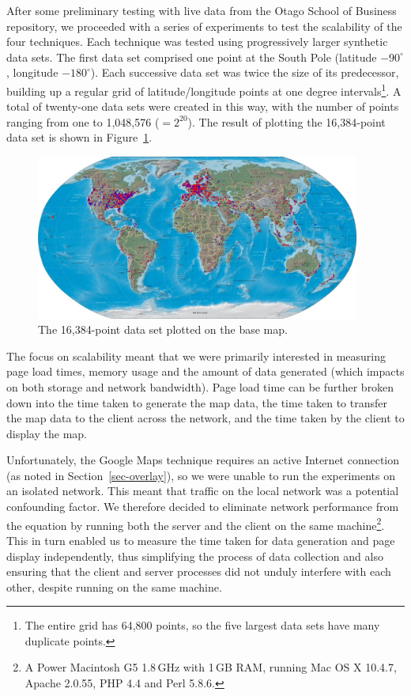 \documentclass[acmtocl,acmnow]{acmtrans2m}
\begin{document}
After some preliminary testing with live data from the Otago School of
Business repository, we proceeded with a series of experiments to test
the scalability of the four techniques. Each technique was tested using
progressively larger synthetic data sets. The first data set comprised
one point at the South Pole (latitude \(-90^{\circ}\), longitude
\(-180^{\circ}\)). Each successive data set was twice the size of its
predecessor, building up a regular grid of latitude/longitude points at
one degree intervals\footnote{The entire grid has 64,800 points, so the
five largest data sets have many duplicate points.}. A total of
twenty-one data sets were created in this way, with the number of points
ranging from one to 1,048,576 (\(=2^{20}\)). The result of plotting the
16,384-point data set is shown in Figure~\ref{fig-grid-points}.


\begin{figure}
	\centering
	\includegraphics[width=0.95\textwidth,keepaspectratio]{ImageGeneration-full}
	\caption{The 16,384-point data set plotted on the base map.}
	\label{fig-grid-points}
\end{figure}


The focus on scalability meant that we were primarily interested in
measuring page load times, memory usage and the amount of data
generated (which impacts on both storage and network bandwidth). Page
load time can be further broken down into the time taken to generate the
map data, the time taken to transfer the map data to the client across
the network, and the time taken by the client to display the map.

Unfortunately, the Google Maps technique requires an active Internet
connection (as noted in Section~\ref{sec-overlay}), so we were unable to
run the experiments on an isolated network. This meant that traffic on
the local network was a potential confounding factor. We therefore
decided to eliminate network performance from the equation by running
both the server and the client on the same machine\footnote{A Power
Macintosh G5 1.8\,GHz with 1\,GB RAM, running Mac OS X 10.4.7, Apache
2.0.55, PHP 4.4 and Perl 5.8.6.}. This in turn enabled us to measure the
time taken for data generation and page display independently, thus
simplifying the process of data collection and also ensuring that the
client and server processes did not unduly interfere with each other,
despite running on the same machine.
\end{document}
